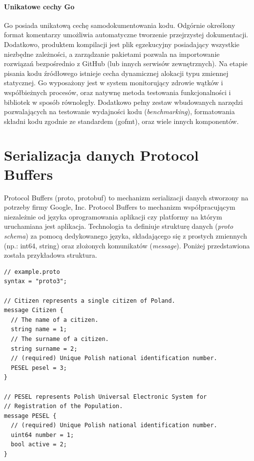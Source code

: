 \documentclass[a4paper,12pt,twoside,openany]{report}
\begin{document}
\paragraph{Unikatowe cechy Go}
Go posiada unikatową cechę samodokumentowania kodu. Odgórnie określony format komentarzy umożliwia automatyczne tworzenie przejrzystej dokumentacji.
Dodatkowo, produktem kompilacji jest plik egzekucyjny posiadający wszystkie niezbędne zależności, a zarządzanie pakietami pozwala na importowanie rozwiązań bezpośrednio z GitHub (lub innych serwisów zewnętrznych).
Na etapie pisania kodu źródłowego istnieje cecha dynamicznej alokacji typu zmiennej statycznej.
Go wyposażony jest w system monitorujący zdrowie wątków i współbieżnych procesów, oraz natywnę metoda testowania funkcjonalności i bibliotek w sposób równoległy.
Dodatkowo pełny zestaw wbudowanych narzędzi pozwalających na testowanie wydajności kodu (\textit{benchmarking}), formatowania składni kodu zgodnie ze standardem (gofmt), oraz wiele innych komponentów.

\section{Serializacja danych Protocol Buffers}

Protocol Buffers (proto, protobuf) to mechanizm serializacji danych stworzony na potrzeby firmy Google, Inc.
Protocol Buffers to mechanizm współpracującym niezależnie od języka oprogramowania aplikacji czy platformy na którym uruchamiana jest aplikacja.
Technologia ta definiuje strukturę danych (\textit{proto schema}) za pomocą dedykowanego języka, składającego się z prostych zmiennych (np.: int64, string) 
oraz złożonych komunikatów (\textit{message}). Poniżej przedstawiona została przykładowa struktura.

\begin{lstlisting}
// example.proto
syntax = "proto3";

// Citizen represents a single citizen of Poland.
message Citizen {
  // The name of a citizen.
  string name = 1;
  // The surname of a citizen.
  string surname = 2;
  // (required) Unique Polish national identification number.
  PESEL pesel = 3;
}

// PESEL represents Polish Universal Electronic System for
// Registration of the Population.
message PESEL {
  // (required) Unique Polish national identification number.
  uint64 number = 1;
  bool active = 2;
}
\end{lstlisting}
\end{document}
